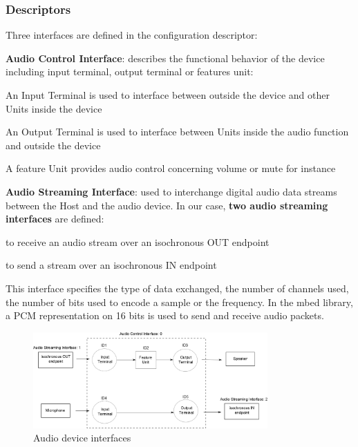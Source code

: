 \documentclass[pdftex,10pt,a4paper]{report}
\newenvironment{packed_item}{
\begin{itemize}
  \setlength{\itemsep}{1pt}
  \setlength{\parskip}{0pt}
  \setlength{\parsep}{0pt}
}{\end{itemize}}
\begin{document}
\subsubsection{Descriptors}
Three interfaces are defined in the configuration descriptor:
\begin{packed_item}
	\item \textbf{Audio Control Interface}: describes the functional behavior of the device including input terminal, output terminal or features unit:
	\begin{packed_item}
		\item An Input Terminal is used to interface between outside the device and other Units inside the device
		\item An Output Terminal is used to interface between Units inside the audio function and outside the device
		\item A feature Unit provides audio control concerning volume or mute for instance
	\end{packed_item}
	
	\item \textbf{Audio Streaming Interface}: used to interchange digital audio data streams between the Host and the audio device. In our case, \textbf{two audio streaming interfaces} are defined:
	\begin{packed_item}
		\item to receive an audio stream over an isochronous OUT endpoint
		\item to send a stream over an isochronous IN endpoint
	\end{packed_item}
	This interface specifies the type of data exchanged, the number of channels used, the number of bits used to encode a sample or the frequency. In the mbed library, a PCM representation on 16 bits is used to send and receive audio packets.
\end{packed_item}

\begin{figure}[h!]
		\centering
		\includegraphics[width=0.8\textwidth]{./audio_archi.jpg}
		\caption{Audio device interfaces}
		\label{Audio device interfaces}
\end{figure}
\end{document}
